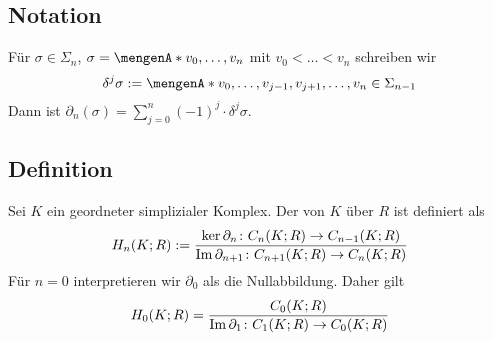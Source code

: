 \subsection[Notation für das Weglassen eines Knotens]{Notation} %
\label{sub:39}
Für $\sigma \in \Sigma_n$, $ \sigma= \set{v_0, \ldots ,v_n} $ mit $v_0 < \ldots < v_n$ schreiben wir 
\[
	\delta^j \sigma := \set{v_0 , \ldots , v_{j-1}, v_{j+1}, \ldots , v_n}  \in \Sigma_{n-1}
\]
Dann ist $\partial_n(\sigma) = \sum_{j=0}^{n} (-1)^j \cdot \delta^j \sigma$.

\subsection[Definition: $n$-ter Homologiemodul]{Definition} %
\label{sub:310}
Sei $K$ ein geordneter simplizialer Komplex. Der  von 
$K$ über $R$ ist definiert als
\[
	H_n(K;R) := \frac{\ker \partial_n \colon C_n(K;R) \to C_{n-1}(K;R)}{\operatorname{Im} \partial_{n+1} \colon C_{n+1}(K;R) \to C_n(K;R)} 
\]
Für $n=0$ interpretieren wir $\partial_0$ als die Nullabbildung. Daher gilt 
\[
	H_0(K;R) = \frac{C_0(K;R)}{\operatorname{Im} \partial_1 \colon C_1(K;R) \to C_0(K;R)} 
\]

